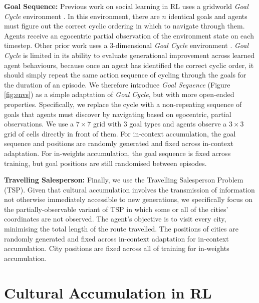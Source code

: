 \documentclass{article}
\begin{document}
\vspace{-10pt}
\textbf{Goal Sequence:} Previous work on social learning in RL uses a gridworld \textit{Goal Cycle} environment \citep{Ndousse21}. In this environment, there are $n$ identical goals and agents must figure out the correct cyclic ordering in which to navigate through them. Agents receive an egocentric partial observation of the environment state on each timestep. Other prior work uses a 3-dimensional \textit{Goal Cycle} environment \citep{bhoopchand23}. \textit{Goal Cycle} is limited in its ability to evaluate generational improvement across learned agent behaviours, because once an agent has identified the correct cyclic order, it should simply repeat the same action sequence of cycling through the goals for the duration of an episode. We therefore introduce \textit{Goal Sequence} (Figure \ref{fig:envs}) as a simple adaptation of \textit{Goal Cycle}, but with more open-ended properties. Specifically, we replace the cycle with a non-repeating sequence of goals that agents must discover by navigating based on egocentric, partial observations. We use a $7 \times 7$ grid with 3 goal types and agents observe a $3 \times 3$ grid of cells directly in front of them. For in-context accumulation, the goal sequence and positions are randomly generated and fixed across in-context adaptation. For in-weights accumulation, the goal sequence is fixed across training, but goal positions are still randomised between episodes.

\textbf{Travelling Salesperson:} Finally, we use the Travelling Salesperson Problem (TSP). Given that cultural accumulation involves the transmission of information not otherwise immediately accessible to new generations, we specifically focus on the partially-observable variant of TSP \citep{buck16, asl19} in which some or all of the cities' coordinates are not observed. The agent's objective is to visit every city, minimising the total length of the route travelled. The positions of cities are randomly generated and fixed across in-context adaptation for in-context accumulation. City positions are fixed across all of training for in-weights accumulation.

\section{Cultural Accumulation in RL}
\end{document}
